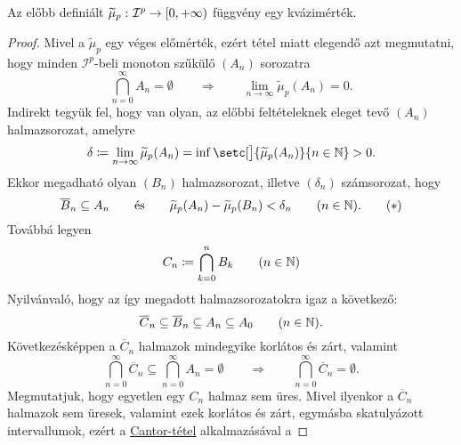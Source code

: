 \documentclass[
]{elteikthesis}[2024/04/26]
\begin{document}
	\begin{theorem}{}{}
		Az előbb definiált \( \widetilde{\mu}_p  \,\colon  \mathcal{I}^p  \to  [0, +\infty) \)
		függvény egy kvázimérték.
	\end{theorem}
	\begin{proof}	
		Mivel a \( \widetilde{\mu}_p \) egy véges előmérték, ezért
		 tétel miatt elegendő azt megmutatni, 
		hogy minden \( \mathcal{I}^p \)-beli monoton szűkülő \( (A_n) \) sorozatra
		\[
			\bigcap_{n=0}^{\infty} A_n = \emptyset
			\qquad \Longrightarrow \qquad
			\lim_{n \to \infty} \widetilde{\mu}_p( A_n ) = 0.
		\]
		Indirekt tegyük fel, hogy van olyan, az előbbi feltételeknek eleget tevő \( (A_n) \) halmazsorozat, amelyre
		\[
			\delta \coloneq
			\lim_{n \to \infty} \widetilde{\mu}_p( A_n ) =
			\inf \setc[\big]{ \widetilde{\mu}_p( A_n ) }{ n \in \N } > 0.
		\]
		\newpage
		Ekkor megadható olyan \( (B_n) \) halmazsorozat, 
		illetve \( (\delta_n) \) számsorozat, hogy
		\begin{equation}\label{eq:lebesgue-kvázimérték-01}
			\overline{B}_n \subseteq A_n
			\qquad \text{és} \qquad
			\widetilde{\mu}_p( A_n ) - \widetilde{\mu}_p( B_n ) < \delta_n
			\qquad (n \in \mathbb{N}).
			\tag{\( * \)}
		\end{equation}
		Továbbá legyen
		\[
			C_n \coloneq \bigcap_{k=0}^n B_k \qquad (n \in \mathbb{N})
		\]
		Nyilvánvaló, hogy az így megadott halmazsorozatokra igaz a következő:
		\[
			\overline{C}_n \subseteq 
			\overline{B}_n \subseteq A_n \subseteq A_0 \qquad (n \in \mathbb{N}).
		\]
		Következésképpen a \( \overline{C}_n \) halmazok mindegyike korlátos és zárt, valamint
		\[
			\bigcap_{n=0}^{\infty} \overline{C}_n \subseteq \bigcap_{n=0}^{\infty} A_n = \emptyset
			\qquad \Longrightarrow \qquad
			\bigcap_{n=0}^{\infty} \overline{C}_n = \emptyset.
		\]
		Megmutatjuk, hogy egyetlen egy \( C_n \) halmaz sem üres.
		Mivel ilyenkor a \( \overline{C}_n \) halmazok sem üresek, 
		valamint ezek korlátos és zárt, egymásba skatulyázott intervallumok, 
		ezért a \hyperref[th:cantor-tétel]{Cantor-tétel} alkalmazásával a
\end{proof}
\end{document}
